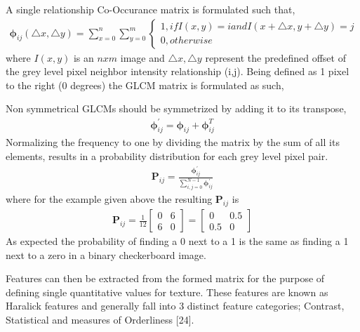 A single relationship Co-Occurance matrix is formulated such that,
%
\begin{align}
    \mathbf{\phi}_{ij}(\triangle x,\triangle y) = \sum_{x=0}^{n}\sum_{y=0}^{m}
    \begin{cases}
        1, if I(x,y) = i  and  I(x+\triangle x,y+\triangle y) = j \\
        0, otherwise
    \end{cases}
\end{align}
%
where $I(x,y)$ is an $n x m$ image and $\triangle x,\triangle y$ represent the predefined offset of the grey level pixel neighbor intensity relationship (i,j).
Being defined as 1 pixel to the right (0 degrees) the GLCM matrix is formulated as such,
%
\begin{center}
\end{center}
%
Non symmetrical GLCMs should be symmetrized by adding it to its transpose,
%
\begin{align}
    \mathbf{\phi}_{ij}^{'} = \mathbf{\phi}_{ij} + \mathbf{\phi}_{ij}^{T}
\end{align}
%
Normalizing the frequency to one by dividing the matrix by the sum of all its elements, results in a probability distribution for each grey level pixel pair.
%
\begin{align}
    \mathbf{P}_{ij} = \frac{\mathbf{\phi}_{ij}^{'}}{\sum_{i,j=0}^{N-1}\mathbf{\phi}_{ij}^{'}}
\end{align}
%
where for the example given above the resulting $\mathbf{P}_{ij}$ is
%
\begin{align}
    \mathbf{P}_{ij} = \frac{1}{12}
    \begin{bmatrix}
        0 & 6 \\
        6 & 0
    \end{bmatrix}
    =
    \begin{bmatrix}
        0 & 0.5 \\
        0.5 & 0
    \end{bmatrix}
\end{align}
%
As expected the probability of finding a 0 next to a 1 is the same as finding a 1 next to a zero in a binary checkerboard image.

Features can then be extracted from the formed matrix for the purpose of defining single quantitative values for texture.  These features are known as Haralick features and generally fall into 3 distinct feature categories; Contrast, Statistical and measures of Orderliness [24].

